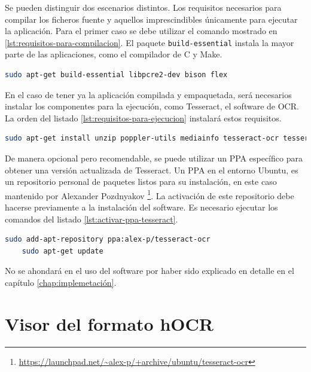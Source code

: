 Se pueden distinguir dos escenarios distintos. Los requisitos necesarios para compilar los ficheros fuente y aquellos imprescindibles únicamente para ejecutar la aplicación. Para el primer caso se debe utilizar el comando mostrado en \ref{lst:requisitos-para-compilacion}. El paquete \verb|build-essential| instala la mayor parte de las aplicaciones, como el compilador de C y Make.

\begin{lstlisting}[language=bash,caption={Dependencias para la compilación},label=lst:requisitos-para-compilacion]
    sudo apt-get build-essential libpcre2-dev bison flex
\end{lstlisting}

En el caso de tener ya la aplicación compilada y empaquetada, será necesarios instalar los componentes para la ejecución, como Tesseract, el software de OCR. La orden del listado \ref{lst:requisitos-para-ejecucion} instalará estos requisitos.

\begin{lstlisting}[language=bash,caption={Dependencias para la ejecución},label=lst:requisitos-para-ejecucion]
    sudo apt-get install unzip poppler-utils mediainfo tesseract-ocr tesseract-ocr-spa jq python3-opencv jq bc
\end{lstlisting}

De manera opcional pero recomendable, se puede utilizar un PPA específico para obtener una versión actualizada de Tesseract. Un PPA en el entorno Ubuntu, es un repositorio personal de paquetes listos para su instalación, en este caso mantenido por Alexander Pozdnyakov \footnote{\url{https://launchpad.net/~alex-p/+archive/ubuntu/tesseract-ocr}}. La activación de este repositorio debe hacerse previamente a la instalación del software. Es necesario ejecutar los comandos del listado \ref{lst:activar-ppa-tesseract}.

\begin{lstlisting}[language=bash,caption={Activar PPA de Tesseract},label=lst:activar-ppa-tesseract]
    sudo add-apt-repository ppa:alex-p/tesseract-ocr
    sudo apt-get update
\end{lstlisting}

No se ahondará en el uso del software por haber sido explicado en detalle en el capítulo \ref{chap:implemetación}.

\section{Visor del formato hOCR}

